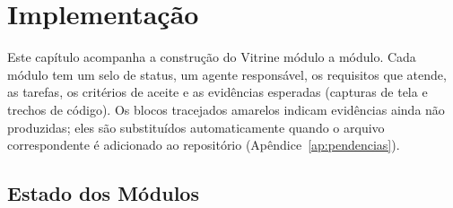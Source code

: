 \chapter{Implementação}\label{cap:implementacao}

Este capítulo acompanha a construção do Vitrine módulo a módulo. Cada módulo tem um selo de status, um agente responsável, os requisitos que atende, as tarefas, os critérios de aceite e as evidências esperadas (capturas de tela e trechos de código). Os blocos tracejados amarelos indicam evidências ainda não produzidas; eles são substituídos automaticamente quando o arquivo correspondente é adicionado ao repositório (Apêndice~\ref{ap:pendencias}).

\section{Estado dos Módulos}\label{sec:modulos}


